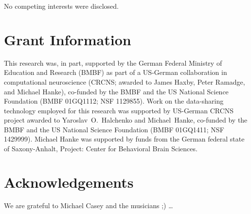 No competing interests were disclosed.

\section*{Grant Information}

This research was, in part, supported by the German Federal Ministry of
Education and Research (BMBF) as part of a US-German collaboration in
computational neuroscience (CRCNS; awarded to James Haxby, Peter Ramadge, and
Michael Hanke), co-funded by the BMBF and the US National Science Foundation
(BMBF 01GQ1112; NSF 1129855).  Work on the data-sharing technology employed for
this research was supported by US-German CRCNS project awarded to
Yaroslav~O.~Halchenko and Michael~Hanke, co-funded by the BMBF and the US
National Science Foundation (BMBF 01GQ1411; NSF 1429999).  Michael Hanke was
supported by funds from the German federal state of Saxony-Anhalt, Project:
Center for Behavioral Brain Sciences.


\section*{Acknowledgements}

We are grateful to Michael Casey and the musicians ;) \ldots
{}





